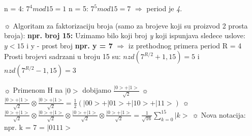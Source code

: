 \documentclass{article}
\begin{document}
n = 4: $7^4 mod 15 = 1$
\newline\hspace*{0.4cm}
n = 5: $7^5 mod 15 = 7$
\newline\hspace*{0.4cm}
$\Rightarrow$ period je \textit{4}.
\begin{tcolorbox}[width=\textwidth,colback={beaublue},outer arc=0mm,colupper=charcoal]    
$\sun$ Algoritam za faktorizaciju broja (samo za brojeve koji su proizvod 2 prosta broja):
\newline\hspace*{0.6cm}
\textbf{npr. broj 15:}
\newline\hspace*{1cm}
Uzimamo bilo koji broj \textit{y} koji ispunjava sledece uslove:
\newline\hspace*{1.2cm}
$y < 15$ i y - prost broj
\newline\hspace*{1cm}
\textbf{npr. y = 7} $\Rightarrow$ iz prethodnog primera period R = 4
\newline\hspace*{1cm}
Prosti brojevi sadrzani u broju 15 su:
\vspace{0.2cm}\newline\hspace*{1.4cm}
$nzd(7^{R/2}+1, 15) = 5$ i $nzd(7^{R/2}-1, 15) = 3$
\end{tcolorbox}

\begin{tcolorbox}[width=\textwidth,colback={beaublue},outer arc=0mm,colupper=charcoal]    
$\sun$ Primenom H na $|0>$ dobijamo $\frac{|0>+|1>}{\sqrt{2}}$
\newline
$\sun$ $\frac{|0>+|1>}{\sqrt{2}} \otimes \frac{|0>+|1>}{\sqrt{2}} = \frac{1}{2}(|00> + |01> + |10> + |11>)$
\newline
$\sun$ $\frac{|0>+|1>}{\sqrt{2}} \otimes \frac{|0>+|1>}{\sqrt{2}} \otimes \frac{|0>+|1>}{\sqrt{2}} \otimes \frac{|0>+|1>}{\sqrt{2}} = \frac{1}{\sqrt{16}}\sum_{k=0}^{15}|k>$
\newline
$\sun$ Nova notacija: npr. k = 7 = $|0111>$
\end{tcolorbox}
\end{document}
